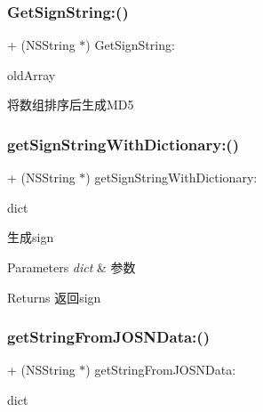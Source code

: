 \subsubsection{\texorpdfstring{Get\+Sign\+String\+:()}{GetSignString:()}}
{\footnotesize\ttfamily + (N\+S\+String $\ast$) Get\+Sign\+String\+: \begin{DoxyParamCaption}\item[{(N\+S\+Array $\ast$)}]{old\+Array }\end{DoxyParamCaption}}

将数组排序后生成\+M\+D5 \mbox{\label{category_n_s_string_07_times_08_a20970fac477cb12307ea48839d43cac2}} 
\subsubsection{\texorpdfstring{get\+Sign\+String\+With\+Dictionary\+:()}{getSignStringWithDictionary:()}}
{\footnotesize\ttfamily + (N\+S\+String $\ast$) get\+Sign\+String\+With\+Dictionary\+: \begin{DoxyParamCaption}\item[{(N\+S\+Dictionary $\ast$)}]{dict }\end{DoxyParamCaption}}

生成sign


\begin{DoxyParams}{Parameters}
{\em dict} & 参数\\
\hline
\end{DoxyParams}
\begin{DoxyReturn}{Returns}
返回sign 
\end{DoxyReturn}
\mbox{\label{category_n_s_string_07_times_08_a3464891b4cc17283a4a9b33009a1a7f4}} 
\subsubsection{\texorpdfstring{get\+String\+From\+J\+O\+S\+N\+Data\+:()}{getStringFromJOSNData:()}}
{\footnotesize\ttfamily + (N\+S\+String $\ast$) get\+String\+From\+J\+O\+S\+N\+Data\+: \begin{DoxyParamCaption}\item[{(N\+S\+Dictionary $\ast$)}]{dict }\end{DoxyParamCaption}}

